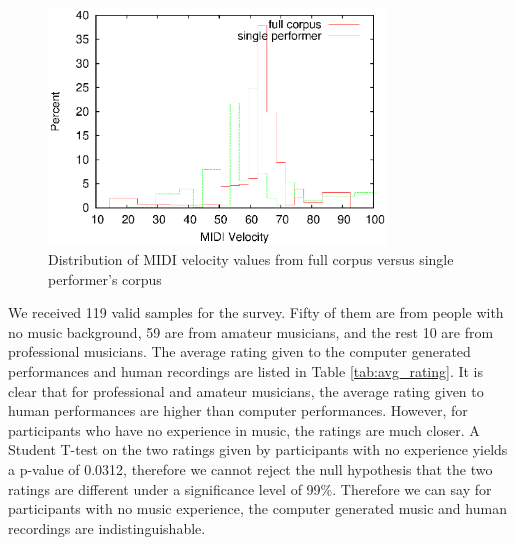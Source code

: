 \begin{figure}[tp]
   \begin{center}
      \includegraphics[width=0.8\textwidth]{fig/all_01_velocity}
   \end{center}
   \caption{Distribution of MIDI velocity values from full corpus versus single performer's corpus}
   \label{fig:distvel}
\end{figure}




We received 119 valid samples for the survey. Fifty of them are from people with no music background, 59 are from amateur musicians, and the rest 10 are from professional musicians. The average rating given to the computer generated performances and human recordings are listed in Table \ref{tab:avg_rating}. It is clear that for professional and amateur musicians, the average rating given to human performances are higher than computer performances. However, for participants who have no experience in music, the ratings are much closer. A Student T-test on the two ratings given by participants with no experience yields a p-value of 0.0312, therefore we cannot reject the null hypothesis that the two ratings are different under a significance level of 99\%. Therefore we can say for participants with no music experience, the computer generated music and human recordings are indistinguishable.


